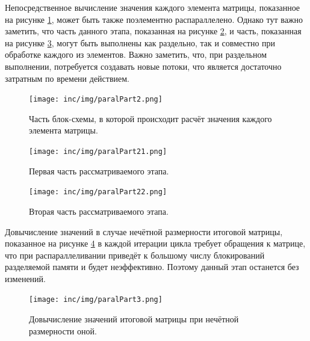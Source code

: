 \documentclass[12pt]{report}
\begin{document}
Непосредственное вычисление значения каждого элемента матрицы, показанное на рисунке \ref{img:paralPart2}, может быть также поэлементно распараллелено. Однако тут важно заметить, что часть данного этапа, показанная на рисунке \ref{img:paralPart21}, и часть, показанная на рисунке \ref{img:paralPart22}, могут быть выполнены как раздельно, так и совместно при обработке каждого из элементов. Важно заметить, что, при раздельном выполнении, потребуется создавать новые потоки, что является достаточно затратным по времени действием.
\begin{figure}
\begin{center}
\texttt{[image: inc/img/paralPart2.png]}
\captionsetup{justification=centering}
	\caption{Часть блок-схемы, в которой происходит расчёт значения каждого элемента матрицы.}
	\label{img:paralPart2}	
\end{center}
\end{figure}

\begin{figure}
\begin{center}
\texttt{[image: inc/img/paralPart21.png]}
\captionsetup{justification=centering}
	\caption{Первая часть рассматриваемого этапа.}
	\label{img:paralPart21}	
\end{center}
\end{figure}

\begin{figure}
\begin{center}
\texttt{[image: inc/img/paralPart22.png]}
\captionsetup{justification=centering}
	\caption{Вторая часть рассматриваемого этапа.}
	\label{img:paralPart22}	
\end{center}
\end{figure}
\newpage

Довычисление значений в случае нечётной размерности итоговой матрицы, показанное на рисунке \ref{img:paralPart3} в каждой итерации цикла требует обращения к матрице, что при распараллеливании приведёт к большому числу блокирований разделяемой памяти и будет неэффективно. Поэтому данный этап останется без изменений.

\begin{figure}
\begin{center}
\texttt{[image: inc/img/paralPart3.png]}
\captionsetup{justification=centering}
	\caption{Довычисление значений итоговой матрицы при нечётной размерности оной.}
	\label{img:paralPart3}	
\end{center}
\end{figure}
\newpage
\end{document}

